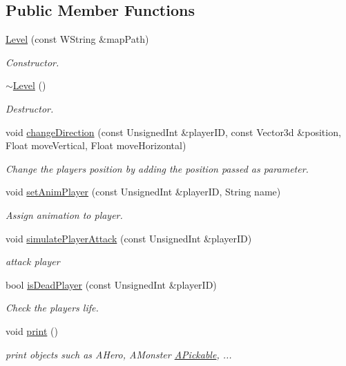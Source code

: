 \subsection*{Public Member Functions}
\begin{DoxyCompactItemize}
\item 
\mbox{\label{classLevel_a449da6ec6c9863a35c94d2fcb2755433}} 
\hyperlink{classLevel_a449da6ec6c9863a35c94d2fcb2755433}{Level} (const W\+String \&map\+Path)
\begin{DoxyCompactList}\small\item\em Constructor. \end{DoxyCompactList}\item 
\mbox{\label{classLevel_a249eac1e8f19ff44134efa5e986feaca}} 
\hyperlink{classLevel_a249eac1e8f19ff44134efa5e986feaca}{$\sim$\+Level} ()
\begin{DoxyCompactList}\small\item\em Destructor. \end{DoxyCompactList}\item 
void \hyperlink{classLevel_a7fbf2259277a0be256738886cd82796a}{change\+Direction} (const Unsigned\+Int \&player\+ID, const Vector3d \&position, Float move\+Vertical, Float move\+Horizontal)
\begin{DoxyCompactList}\small\item\em Change the player\textquotesingle{}s position by adding the position passed as parameter. \end{DoxyCompactList}\item 
void \hyperlink{classLevel_a2330b2345dcf859700874c29b1f524e0}{set\+Anim\+Player} (const Unsigned\+Int \&player\+ID, String name)
\begin{DoxyCompactList}\small\item\em Assign animation to player. \end{DoxyCompactList}\item 
void \hyperlink{classLevel_ad31dd05f4278c778da85e79a0fd04430}{simulate\+Player\+Attack} (const Unsigned\+Int \&player\+ID)
\begin{DoxyCompactList}\small\item\em attack player \end{DoxyCompactList}\item 
bool \hyperlink{classLevel_a0ce4503fce6dd9f1a96036a50743d6c6}{is\+Dead\+Player} (const Unsigned\+Int \&player\+ID)
\begin{DoxyCompactList}\small\item\em Check the player\textquotesingle{}s life. \end{DoxyCompactList}\item 
\mbox{\label{classLevel_a5188de55912386ca786cdbe093ca2af4}} 
void \hyperlink{classLevel_a5188de55912386ca786cdbe093ca2af4}{print} ()
\begin{DoxyCompactList}\small\item\em print objects such as A\+Hero, A\+Monster \hyperlink{classAPickable}{A\+Pickable}, ... \end{DoxyCompactList}\end{DoxyCompactItemize}


